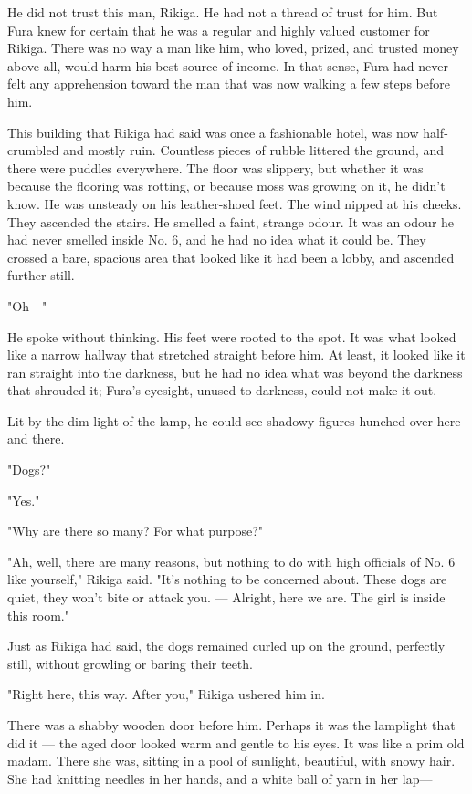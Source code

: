 He did not trust this man, Rikiga. He had not a thread of trust for him.
But Fura knew for certain that he was a regular and highly valued
customer for Rikiga. There was no way a man like him, who loved, prized,
and trusted money above all, would harm his best source of income. In
that sense, Fura had never felt any apprehension toward the man that was
now walking a few steps before him.

This building that Rikiga had said was once a fashionable hotel, was now
half-crumbled and mostly ruin. Countless pieces of rubble littered the
ground, and there were puddles everywhere. The floor was slippery, but
whether it was because the flooring was rotting, or because moss was
growing on it, he didn't know. He was unsteady on his leather-shoed
feet. The wind nipped at his cheeks. They ascended the stairs. He
smelled a faint, strange odour. It was an odour he had never smelled
inside No. 6, and he had no idea what it could be. They crossed a bare,
spacious area that looked like it had been a lobby, and ascended further
still.

"Oh---"

He spoke without thinking. His feet were rooted to the spot. It was what
looked like a narrow hallway that stretched straight before him. At
least, it looked like it ran straight into the darkness, but he had no
idea what was beyond the darkness that shrouded it; Fura's eyesight,
unused to darkness, could not make it out.

Lit by the dim light of the lamp, he could see shadowy figures hunched
over here and there.

"Dogs?"

"Yes."

"Why are there so many? For what purpose\el ?"

"Ah, well, there are many reasons, but nothing to do with high officials
of No. 6 like yourself," Rikiga said. "It's nothing to be concerned
about. These dogs are quiet, they won't bite or attack you. --- Alright,
here we are. The girl is inside this room."

Just as Rikiga had said, the dogs remained curled up on the ground,
perfectly still, without growling or baring their teeth.

"Right here, this way. After you," Rikiga ushered him in.

There was a shabby wooden door before him. Perhaps it was the lamplight
that did it --- the aged door looked warm and gentle to his eyes. It was
like a prim old madam. There she was, sitting in a pool of sunlight,
beautiful, with snowy hair. She had knitting needles in her hands, and a
white ball of yarn in her lap---

